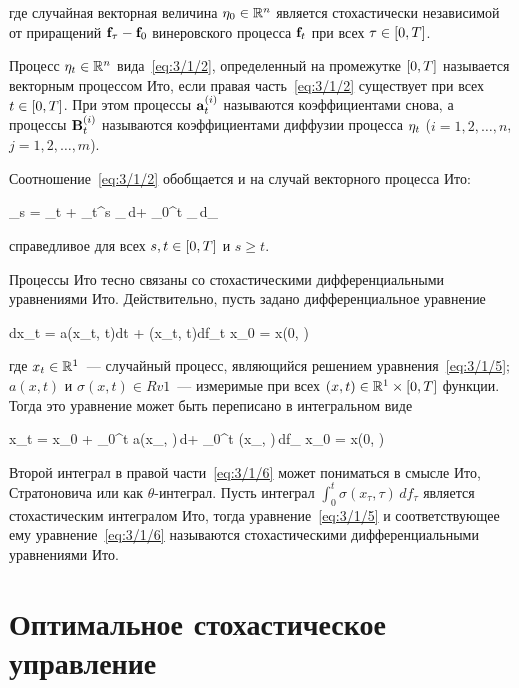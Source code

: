 где случайная векторная величина $\mathbf{\eta}_0 \in \mathbb{R}^{n}$ является стохастически независимой от приращений $\mathbf{f}_\tau - \mathbf{f}_0$ винеровского процесса $\mathbf{f}_t$ при всех $\tau \in [0, T]$.

\begin{df}
	Процесс $\mathbf{\eta}_t \in \mathbb{R}^{n}$ вида~\ref{eq:3/1/2}, определенный на промежутке $[0, T]$ называется векторным процессом Ито, если правая часть~\ref{eq:3/1/2} существует при всех $t \in [0, T]$. При этом процессы $\mathbf{a}_t^{(i)}$ называются коэффициентами снова, а процессы $\mathbf{B}_t^{(i)}$ называются коэффициентами диффузии процесса $\mathbf{\eta}_t$ ($i = 1, 2, \ldots, n$, $j = 1, 2, \ldots, m$).
\end{df}

Соотношение~\ref{eq:3/1/2} обобщается и на случай векторного процесса Ито:

	\eta_s = \eta_t + \int\limits_t^s _\tau\,d\tau + \int\limits_0^t _\tau\,d_\tau {}
\eeq

справедливое для всех $s, t \in [0, T]$ и $s \geqslant t$.

\br

Процессы Ито тесно связаны со стохастическими дифференциальными уравнениями Ито. Действительно, пусть задано дифференциальное уравнение

	dx_t = a(x_t, t)dt + \sigma(x_t, t)df_t \text{; } x_0 = x(0, \omega) \text{,}
\eeq

где $x_t \in \mathbb{R}^{1}$~--- случайный процесс, являющийся решением уравнения~\ref{eq:3/1/5}; $a(x, t)$ и $\sigma(x, t) \in Rv{1}$~--- измеримые при всех $(x, t) \in \mathbb{R}^{1} \times [0, T]$ функции. Тогда это уравнение может быть переписано в интегральном виде

	x_t = x_0 + \int\limits_0^t a(x_\tau, \tau)\,d\tau + \int\limits_0^t \sigma(x_\tau, \tau)\,df_\tau \text{; } x_0 = x(0, \omega) 
\eeq

Второй интеграл в правой части~\ref{eq:3/1/6} может пониматься в смысле Ито, Стратоновича или как $\theta$-интеграл\cite{KUZNETCOV}. Пусть интеграл $\int_0^t \sigma(x_\tau, \tau)\,df_\tau$ является стохастическим интегралом Ито, тогда уравнение~\ref{eq:3/1/5} и соответствующее ему уравнение~\ref{eq:3/1/6} называются стохастическими дифференциальными уравнениями Ито.



\section{Оптимальное стохастическое управление}



